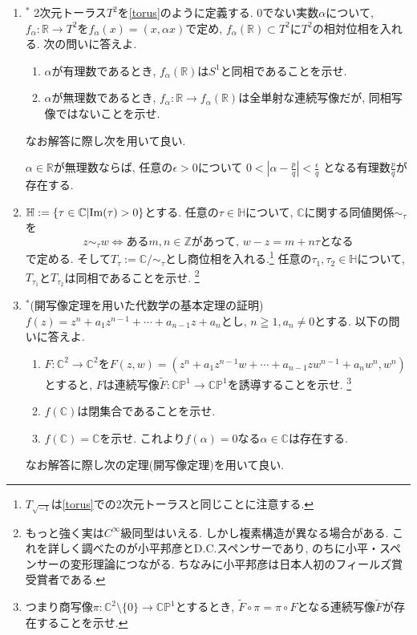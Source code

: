 \documentclass[dvipdfmx,a4paper,11pt]{article}
\newcommand{\R}{\mathbb{R}}
\newcommand{\Z}{\mathbb{Z}}
\newcommand{\C}{\mathbb{C}}
\theoremstyle{definition}
\begin{document}
\begin{enumerate}[label=\textbf{問}\ref*{sec-compact_continue}.\arabic*]
 \item \label{foliation}$^{*}$ 2次元トーラス$T^2$を\ref{torus}のように定義する. 0でない実数$\alpha$について, $f_{\alpha}: \R \rightarrow T^2$を$f_{\alpha}(x) =  (x, \alpha x)$で定め, $f_{\alpha}(\R) \subset T^2$に$T^2$の相対位相を入れる. 次の問いに答えよ.

\begin{enumerate}
 \setlength{\parskip}{0cm}
  \setlength{\itemsep}{0pt} 
\item $\alpha$が有理数であるとき, $f_{\alpha}(\R) $は$S^1$と同相であることを示せ.
\item $\alpha$が無理数であるとき, $f_{\alpha}: \R \rightarrow f_{\alpha}(\R) $は全単射な連続写像だが, 同相写像ではないことを示せ. 
\end{enumerate}
なお解答に際し次を用いて良い.
 \begin{tcolorbox}[
    colback = white,
    colframe = green!35!black,
    fonttitle = \bfseries,
    breakable = true]
$\alpha \in \R$が無理数ならば, 任意の$\epsilon >0$について
$
0 < \left|\alpha - \frac{p}{q}\right| < \frac{\epsilon }{q}
$
となる有理数$\frac{p}{q}$が存在する.
 \end{tcolorbox}

\item \label{kodaira}$\mathbb{H} := \{ \tau \in \C | {\rm Im}(\tau)>0\}$とする.
 任意の$\tau \in \mathbb{H}$について, $\C$に関する同値関係$\sim_{\tau}$を
$$
z\sim_{\tau} w \Leftrightarrow \text{ある$m,n \in \Z$があって, $w-z = m+n\tau$となる}
$$
で定める. そして$T_{\tau} := \C/\sim_{\tau}$とし商位相を入れる.\footnote{$T_{\sqrt{-1}}$は\ref{torus}での2次元トーラスと同じことに注意する.}
 任意の$\tau_1, \tau_2 \in \mathbb{H}$について, $T_{\tau_1}$と$T_{\tau_2}$は同相であることを示せ. \footnote{もっと強く実は$C^{\infty}$級同型はいえる. しかし複素構造が異なる場合がある. これを詳しく調べたのが小平邦彦とD.C.スペンサーであり, のちに小平・スペンサーの変形理論につながる. ちなみに小平邦彦は日本人初のフィールズ賞受賞者である. }

\item \label{algebraic} $^{*}$(開写像定理を用いた代数学の基本定理の証明) $f(z) = z^n + a_1 z^{n-1}+ \cdots + a_{n-1}z + a_n$とし, $n \geqq 1, a_n \neq 0$とする.  以下の問いに答えよ.
   \begin{enumerate}
\setlength{\parskip}{0cm} 
  \setlength{\itemsep}{0cm} 
\item $F : \C^2 \rightarrow \C^2$を$F(z,w) = (z^n + a_1 z^{n-1}w+ \cdots +a_{n-1}zw^{n-1} + a_n w^n, w^n )$とすると, $F$は連続写像$\widetilde{F} : \C\mathbb{P}^{1} \to \C\mathbb{P}^{1} $を誘導することを示せ. \footnote{つまり商写像$\pi : \C^{2} \setminus \{0\}  \to \C\mathbb{P}^{1}$とするとき, $\widetilde{F} \circ \pi = \pi \circ F$となる連続写像$\widetilde{F}$が存在することを示せ.}
\item $f(\C)$は閉集合であることを示せ.
\item $f(\C)=\C$を示せ. これより$f(\alpha)=0$なる$\alpha \in \C$は存在する.
      \end{enumerate}  
なお解答に際し次の定理(開写像定理)を用いて良い.


\end{enumerate}
\end{document}

